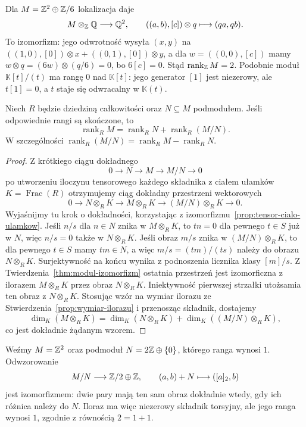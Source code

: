 \begin{przyklad}
Dla $M=\mathbb{Z}^2\oplus\mathbb{Z}/6$ lokalizacja daje
\[
 M\otimes_{\mathbb{Z}}\mathbb{Q}\longrightarrow\mathbb{Q}^2,\qquad
 ((a,b),[c])\otimes q\longmapsto(qa,qb).
\]
To izomorfizm: jego odwrotność wysyła $(x,y)$ na
$((1,0),[0])\otimes x+((0,1),[0])\otimes y$,
a dla $w=((0,0),[c])$ mamy
$w\otimes q=(6w)\otimes(q/6)=0$, bo $6[c]=0$.
Stąd $\operatorname{rank}_{\mathbb{Z}}M=2$.
Podobnie moduł $\mathbb K[t]/(t)$ ma rangę $0$
nad $\mathbb K[t]$: jego generator $[1]$ jest niezerowy,
ale $t[1]=0$, a $t$ staje się odwracalny w
$\mathbb K(t)$.
\end{przyklad}

\begin{stwierdzenie}
\label{prop:ranga-ilorazu}
Niech $R$ będzie dziedziną całkowitości oraz
$N\subseteq M$ podmodułem. Jeśli odpowiednie rangi są skończone, to
\[
\operatorname{rank}_R M
=
\operatorname{rank}_R N
+
\operatorname{rank}_R(M/N).
\]
W szczególności $\operatorname{rank}_R(M/N)
=\operatorname{rank}_R M-\operatorname{rank}_R N$.
\end{stwierdzenie}

\begin{proof}
Z krótkiego ciągu dokładnego
\[
0\longrightarrow N
\longrightarrow M
\longrightarrow M/N
\longrightarrow0
\]
po utworzeniu iloczynu tensorowego każdego składnika
z ciałem ułamków $K=\operatorname{Frac}(R)$
otrzymujemy ciąg dokładny przestrzeni wektorowych
\[
0
\longrightarrow
N\otimes_R K
\longrightarrow
M\otimes_R K
\longrightarrow
(M/N)\otimes_R K
\longrightarrow0.
\]
Wyjaśnijmy tu krok o dokładności, korzystając z
izomorfizmu~\ref{prop:tensor-cialo-ulamkow}. Jeśli $n/s$
dla $n\in N$ znika w $M\otimes_R K$, to $tn=0$
dla pewnego $t\in S$ już w $N$, więc $n/s=0$ także
w $N\otimes_R K$. Jeśli obraz $m/s$ znika w
$(M/N)\otimes_R K$, to dla pewnego $t\in S$ mamy
$tm\in N$, a więc $m/s=(tm)/(ts)$ należy do obrazu
$N\otimes_R K$. Surjektywność na końcu wynika z
podnoszenia licznika klasy $[m]/s$.
Z Twierdzenia~\ref{thm:modul-izomorfizm} ostatnia przestrzeń
jest izomorficzna z ilorazem $M\otimes_R K$
przez obraz $N\otimes_R K$. Iniektywność pierwszej strzałki
utożsamia ten obraz z $N\otimes_R K$.
Stosując wzór na wymiar ilorazu ze
Stwierdzenia~\ref{prop:wymiar-ilorazu} i przenosząc składnik, dostajemy
\[
\dim_K(M\otimes_R K)
=
\dim_K(N\otimes_R K)
+
\dim_K((M/N)\otimes_R K),
\]
co jest dokładnie żądanym wzorem.
\end{proof}

\begin{przyklad}
Weźmy $M=\mathbb{Z}^2$ oraz podmoduł
$N=2\mathbb{Z}\oplus\{0\}$, którego ranga wynosi $1$.
Odwzorowanie
\[
 M/N\longrightarrow\mathbb{Z}/2\oplus\mathbb{Z},\qquad
 (a,b)+N\longmapsto([a]_2,b)
\]
jest izomorfizmem: dwie pary mają ten sam obraz
dokładnie wtedy, gdy ich różnica należy do $N$.
Iloraz ma więc niezerowy składnik torsyjny, ale jego
ranga wynosi $1$, zgodnie z równością $2=1+1$.
\end{przyklad}

